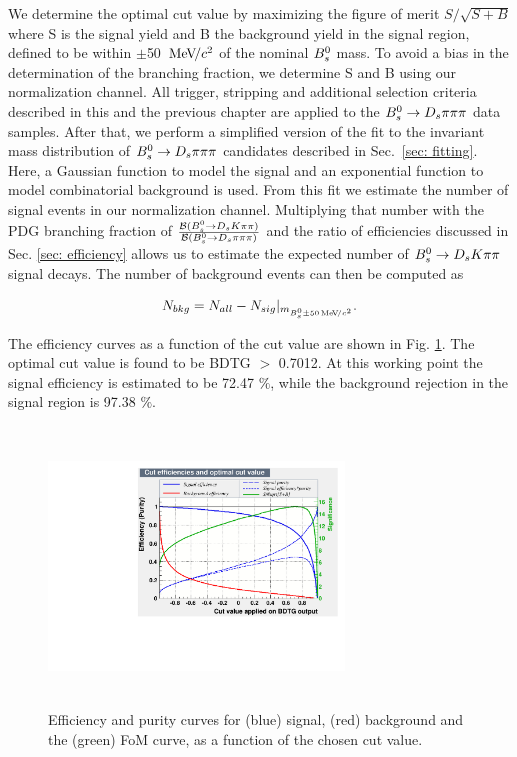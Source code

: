        
We determine the optimal cut value by maximizing the figure of merit $S/\sqrt{S+B}$ where S is the signal yield and B the background yield in the signal region, defined to be within $\pm$50 ${\mathrm{\,Me\kern -0.1em V\!/}c^2}$ of the nominal ${{B}^0_{s}}$ mass. 
To avoid a bias in the determination of the branching fraction, we determine S and B using our normalization channel. 
All trigger, stripping and additional selection criteria described in this and the previous chapter are applied to the ${{B}^0_{s}}\rightarrow{\ensuremath{{D}_{s}}}{\ensuremath{\pi}}{\ensuremath{\pi}}{\ensuremath{\pi}}$ data samples. 
After that, we perform a simplified version of the fit to the invariant mass distribution of ${{B}^0_{s}}\rightarrow{\ensuremath{{D}_{s}}}{\ensuremath{\pi}}{\ensuremath{\pi}}{\ensuremath{\pi}}$ candidates described in Sec.~\ref{sec: fitting}.
Here, a Gaussian function to model the signal and an exponential function to model combinatorial background is used.
From this fit we estimate the number of signal events in our normalization channel. 
Multiplying that number with the PDG branching fraction of $\frac{\mathcal{B}({{B}^0_{s}}\rightarrow{\ensuremath{{D}_{s}}}{\ensuremath{K}}{\ensuremath{\pi}}{\ensuremath{\pi}})}{\mathcal{B}({{B}^0_{s}}\rightarrow{\ensuremath{{D}_{s}}}{\ensuremath{\pi}}{\ensuremath{\pi}}{\ensuremath{\pi}})}$ and the ratio of efficiencies discussed in Sec. \ref{sec: efficiency} allows us to estimate the expected number of ${{B}^0_{s}}\rightarrow{\ensuremath{{D}_{s}}}{\ensuremath{K}}{\ensuremath{\pi}}{\ensuremath{\pi}}$ signal decays. The number of background events can then be computed as

\begin{equation}
 N_{bkg}=N_{all}-N_{sig}|_{m_{{{B}^0_{s}}\pm50{\mathrm{\,Me\kern -0.1em V\!/}c^2}}}.   
\end{equation}

The efficiency curves as a function of the cut value are shown in Fig. \ref{fig:BDT_Efficiency}. 
The optimal cut value is found to be BDTG $>$ 0.7012. At this working point the signal efficiency is estimated to be 72.47 $\%$, while the background rejection in the signal region is 97.38 $\%$. 


\begin{figure}[h]
\includegraphics[height=7.4cm,width=0.7\textwidth]{figs/BDT_CutEfficiency.pdf}
\caption{Efficiency and purity curves for (blue) signal, (red) background and the (green) FoM curve, as a function of the chosen cut value.}
\label{fig:BDT_Efficiency}
\end{figure}
